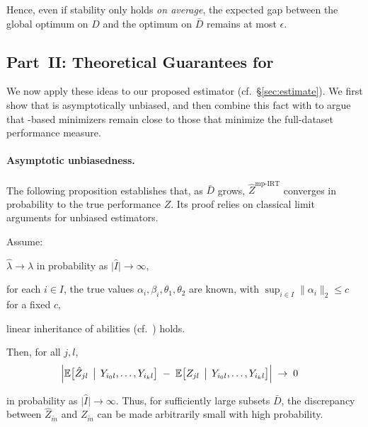 Hence, even if stability only holds \emph{on average}, the expected gap between 
the global optimum on \(D\) and the optimum on \(\bar{D}\) remains at most \(\epsilon\).

\subsection{Part~II: Theoretical Guarantees for \texorpdfstring{\mpirt{}}{mp-IRT}}
\label{subsec:mp-irt-theory}

We now apply these ideas to our proposed \mpirt{} estimator  (cf.\ \S\ref{sec:estimate}).  We first show that \mpirt{} is asymptotically  unbiased, and then combine this fact with   to argue that \mpirt{}-based minimizers remain close to those that minimize  the full-dataset performance measure.

\paragraph{Asymptotic unbiasedness.}
\label{par:asymptotic-consistency}
The following proposition establishes that, as \(\bar{D}\) grows,  \(\hat{Z}^{\mathrm{mp\text{-}IRT}}\) converges in probability to the true performance \(Z\). Its proof relies on classical limit arguments for unbiased estimators.

\begin{proposition}
\label{prop:estimator-unbiased}
Assume:
\begin{enumerate*}[label=(\roman*)]
    \item \(\hat{\lambda} \to \lambda\) in probability as 
    \(\lvert \hat{I}\rvert \to \infty\),
    \item for each \(i\in I\), the true values \(\alpha_i,\beta_i,\theta_1,\theta_2\) 
          are known, with \(\sup_{i\in I}\|\alpha_i\|_2 \le c\) for a fixed \(c\),
    \item linear inheritance of abilities 
          (cf.\ ) holds.
\end{enumerate*}
Then, for all \(j,l\),
\begin{align*}
    &\Bigl|\mathbb{E}\bigl[\hat{Z}_{jl}\,\bigm|\,
      Y_{i_0l},\dots,Y_{i_kl}
    \bigr]
    \;-\;
    \mathbb{E}\bigl[Z_{jl}\,\bigm|\,
      Y_{i_0l},\dots,Y_{i_kl}
    \bigr]
  \Bigr| \;\to\; 0
\end{align*}
\end{proposition}
in probability as $\lvert \hat{I}\rvert \to \infty$.
Thus, for sufficiently large subsets \(\bar{D}\), the discrepancy between 
\(\hat{Z}_{\tilde{m}}\) and \(Z_{\tilde{m}}\) can be made arbitrarily small 
with high probability.


